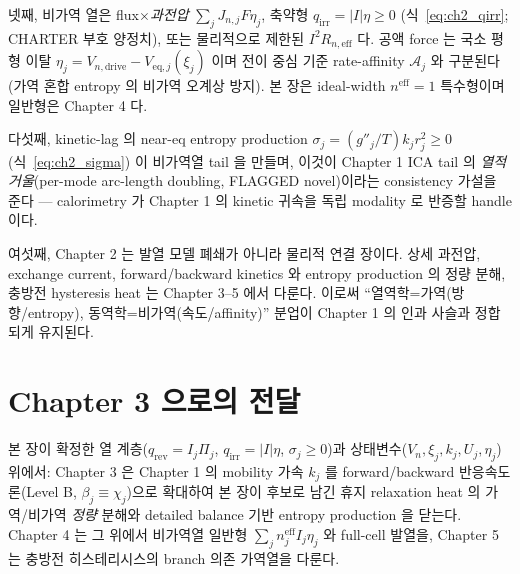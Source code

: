 \documentclass[11pt,a4paper]{article}
\newcommand{\eff}{\mathrm{eff}}
\newcommand{\eq}{\mathrm{eq}}
\newcommand{\drive}{\mathrm{drive}}
\newcommand{\irr}{\mathrm{irr}}
\newcommand{\rev}{\mathrm{rev}}
\begin{document}
넷째, 비가역 열은 flux$\times$\emph{과전압} $\sum_jJ_{n,j}F\eta_j$, 축약형 $q_\irr=|I|\eta\ge0$
(식~\eqref{eq:ch2_qirr}; CHARTER 부호 양정치), 또는 물리적으로 제한된 $I^2R_{n,\eff}$ 다. 공액 force 는 국소
평형 이탈 $\eta_j=V_{n,\drive}-V_{\eq,j}(\xi_j)$ 이며 전이 중심 기준 rate-affinity $\mathcal A_j$ 와 구분된다
(가역 혼합 entropy 의 비가역 오계상 방지). 본 장은 ideal-width $n^\eff=1$ 특수형이며 일반형은 Chapter 4 다.

다섯째, kinetic-lag 의 near-eq entropy production $\sigma_j=(g''_j/T)k_j r_j^2\ge0$ (식~\eqref{eq:ch2_sigma})
이 비가역열 tail 을 만들며, 이것이 Chapter 1 ICA tail 의 \emph{열적 거울}(per-mode arc-length doubling, FLAGGED
novel)이라는 consistency 가설을 준다 — calorimetry 가 Chapter 1 의 kinetic 귀속을 독립 modality 로 반증할
handle 이다.

여섯째, Chapter 2 는 발열 모델 폐쇄가 아니라 물리적 연결 장이다. 상세 과전압, exchange current,
forward/backward kinetics 와 entropy production 의 정량 분해, 충방전 hysteresis heat 는 Chapter 3--5 에서
다룬다. 이로써 ``열역학=가역(방향/entropy), 동역학=비가역(속도/affinity)'' 분업이 Chapter 1 의 인과 사슬과
정합되게 유지된다.

\section*{Chapter 3 으로의 전달}
본 장이 확정한 열 계층($q_\rev=I_j\Pi_j$, $q_\irr=|I|\eta$, $\sigma_j\ge0$)과 상태변수($V_n,\xi_j,k_j,U_j,
\eta_j$) 위에서: Chapter 3 은 Chapter 1 의 mobility 가속 $k_j$ 를 forward/backward 반응속도론(Level B,
$\beta_j\equiv\chi_j$)으로 확대하여 본 장이 후보로 남긴 휴지 relaxation heat 의 가역/비가역 \emph{정량} 분해와
detailed balance 기반 entropy production 을 닫는다. Chapter 4 는 그 위에서 비가역열 일반형
$\sum_j n_j^{\eff}I_j\eta_j$ 와 full-cell 발열을, Chapter 5 는 충방전 히스테리시스의 branch 의존 가역열을 다룬다.
\end{document}
